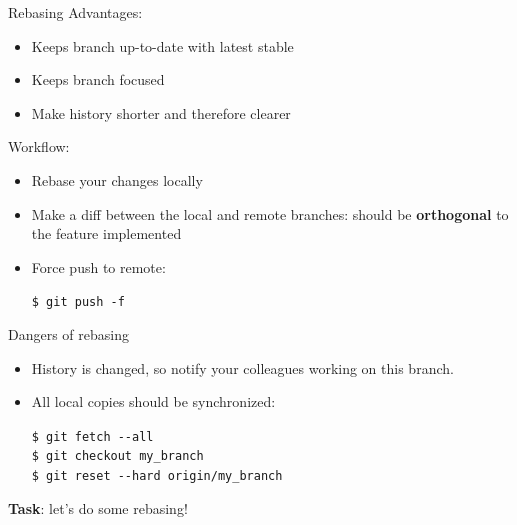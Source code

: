 \documentclass[compress,english,aspectratio=1610]{beamer}
\let\olditem\item
\renewcommand{\item}{\setlength{\itemsep}{\fill}\olditem}
\begin{document}
\begin{frame}{Rebasing}
	Advantages:
	\begin{itemize}
		\item Keeps branch up-to-date with latest stable
		\item Keeps branch focused
		\item Make history shorter and therefore clearer
	\end{itemize}
	Workflow:
	\begin{itemize}
		\item Rebase your changes locally
		\item Make a diff between the local and remote branches: should be \textbf{orthogonal} to the feature implemented
		\item Force push to remote:

	\begin{tcolorbox}[colback=mpg-gray,colframe=mpg-green,title=Force push]
		{\tt \$ git push -f}
	\end{tcolorbox}
	\end{itemize}
\end{frame}

\begin{frame}{Dangers of rebasing}
	\begin{tcolorbox}[colback=mpg-gray,colframe=red!40!black,title=Warning]
		\begin{itemize}
			\item History is changed, so notify your colleagues working on this branch.
			\item All local copies should be synchronized:

					{\tt \$ git fetch -{}-all}\\
					{\tt \$ git checkout my\_branch}\\
					{\tt \$ git reset -{}-hard origin/my\_branch}
		\end{itemize}
	\end{tcolorbox}
	\textbf{Task}: let's do some rebasing!
\end{frame}
\end{document}
